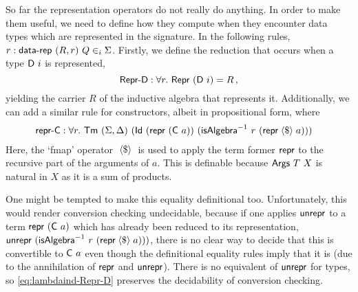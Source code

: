 So far the representation operators do not really do anything. In order to make
them useful, we need to define how they compute when they encounter data types
which are represented in the signature.
In the following rules, $r : \mta{data-rep}\ (R, r)\ Q \in_i \Sigma$.
Firstly, we define the reduction that occurs when a type $\textsf{D}\ i$ is represented,
\begin{equation}
  \mta{Repr-D} : \forall r.\ \MRepr\ (\mta{D}\ i) = R \,, \label{eq:lambdaind-Repr-D}
\end{equation}
yielding the carrier $R$ of the inductive algebra that represents it.
Additionally, we can add a similar rule for constructors, albeit in propositional form, where
\begin{align*}
&\mta{repr-C} : \forall r.\ \Tm\ (\Sigma, \Delta)\ (\mta{Id}\ (\Mrepr\ (\mta{C}\ a))\ (\mta{isAlgebra}^{-1}\ r\ (\mta{repr} \fmap a)))
\end{align*}
Here, the `fmap' operator $\;\langle\$\rangle\;$ is used to apply the term former $\textsf{repr}$
to the recursive part of the arguments of $a$. This is definable because
$\mta{Args}\ T\ X$ is natural in $X$ as it is a sum of products.

One might be tempted to make this equality definitional too. Unfortunately, this
would render conversion checking undecidable, because if one applies
$\textsf{unrepr}$ to a term $\textsf{repr}\ (\textsf{C}\ a)$ which has already been reduced
to its representation, $\textsf{unrepr}\ (\textsf{isAlgebra}^{-1}\ r\ (\textsf{repr}
\;\langle\$\rangle\; a)))$, there is no clear way to decide that this is convertible to
$\textsf{C}\ a$ even though the definitional equality rules imply that it is (due
to the annihilation of $\textsf{repr}$ and $\textsf{unrepr}$). There is no
equivalent of $\textsf{unrepr}$ for types, so \eqref{eq:lambdaind-Repr-D} preserves
the decidability of conversion checking.


